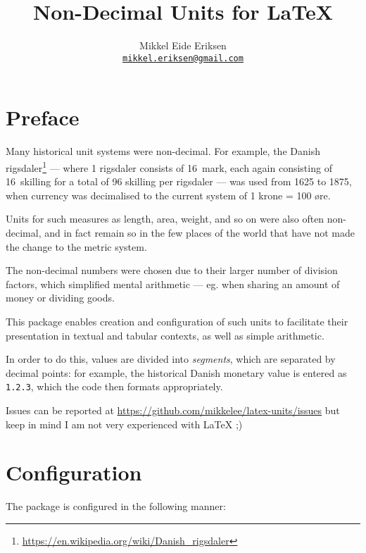 \documentclass{article}
\title{Non-Decimal Units for \LaTeX}
\author{Mikkel Eide Eriksen\\\href{mailto:mikkel.eriksen@gmail.com}{\texttt{mikkel.eriksen@gmail.com}}}
\begin{document}
\maketitle

\section{Preface} %

Many historical unit systems were non-decimal. For example, the Danish rigsdaler\footnote{\url{https://en.wikipedia.org/wiki/Danish_rigsdaler}} --- where 1 rigsdaler consists of 16~mark, each again consisting of 16~skilling for a total of 96 skilling per rigsdaler --- was used from 1625 to 1875, when currency was decimalised to the current system of 1 krone = 100 øre.


Units for such measures as length, area, weight, and so on were also often non-decimal, and in fact remain so in the few places of the world that have not made the change to the metric system.

The non-decimal numbers were chosen due to their larger number of division factors, which simplified mental arithmetic --- eg. when sharing an amount of money or dividing goods.

This package enables creation and configuration of such units to facilitate their presentation in textual and tabular contexts, as well as simple arithmetic.

In order to do this, values are divided into \emph{segments}, which are separated by decimal points: for example, the historical Danish monetary value  is entered as \texttt{1.2.3}, which the code then formats appropriately.

Issues can be reported at \url{https://github.com/mikkelee/latex-units/issues} but keep in mind I am not very experienced with \LaTeX{} ;)

\clearpage
\section{Configuration} %

The package is configured in the following manner:
\end{document}
